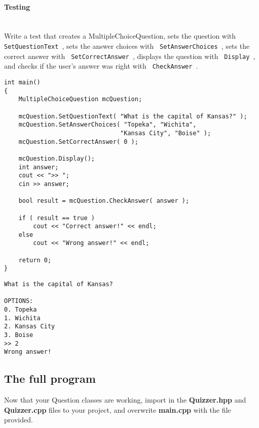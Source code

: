 \documentclass[a4paper,12pt]{book}
\begin{document}
                    \paragraph{ Testing } ~\\
                        Write a test that creates a MultipleChoiceQuestion,
                        sets the question with \texttt{ SetQuestionText },
                        sets the answer choices with \texttt{ SetAnswerChoices },
                        sets the correct answer with \texttt{ SetCorrectAnswer },
                        displays the question with \texttt{ Display },
                        and checks if the user's answer was right with \texttt{ CheckAnswer }. \\

                    \newpage
\begin{lstlisting}[style=code]
int main()
{
    MultipleChoiceQuestion mcQuestion;

    mcQuestion.SetQuestionText( "What is the capital of Kansas?" );
    mcQuestion.SetAnswerChoices( "Topeka", "Wichita",
                                "Kansas City", "Boise" );
    mcQuestion.SetCorrectAnswer( 0 );

    mcQuestion.Display();
    int answer;
    cout << ">> ";
    cin >> answer;

    bool result = mcQuestion.CheckAnswer( answer );

    if ( result == true )
        cout << "Correct answer!" << endl;
    else
        cout << "Wrong answer!" << endl;

    return 0;
}
\end{lstlisting}

\begin{lstlisting}[style=output]
What is the capital of Kansas?

OPTIONS:
0. Topeka
1. Wichita
2. Kansas City
3. Boise
>> 2
Wrong answer!

\end{lstlisting}
                    
            \newpage{}
            \subsection*{The full program}

                Now that your Question classes are working,
                import in the \textbf{ Quizzer.hpp } and \textbf{ Quizzer.cpp }
                files to your project, and overwrite \textbf{ main.cpp }
                with the file provided.
\end{document}
